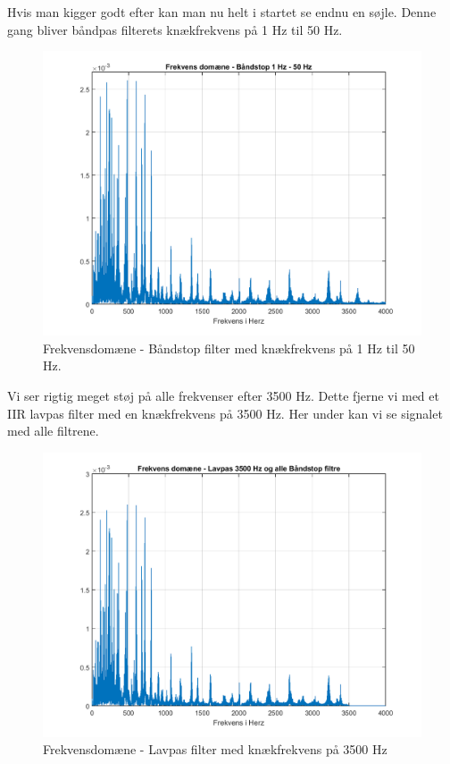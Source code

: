 \documentclass[12pt, letterpaper]{article}
\begin{document}
\newpage
Hvis man kigger godt efter kan man nu helt i startet se endnu en søjle. 
Denne gang bliver båndpas filterets knækfrekvens på 1 Hz til 50 Hz. 
\begin{figure}[H]
           \includegraphics[width=\linewidth]{billeder/VinylBS1}	   							\caption{Frekvensdomæne - Båndstop filter med knækfrekvens på 1 Hz til 50 Hz. }
\end{figure} 

\newpage
Vi ser rigtig meget støj på alle frekvenser efter 3500 Hz. Dette fjerne vi med et IIR lavpas filter med en knækfrekvens på 3500 Hz. Her under kan vi se signalet med alle filtrene. 
\begin{figure}[H]
           \includegraphics[width=\linewidth]{billeder/VinylLP3500}	   							\caption{Frekvensdomæne - Lavpas filter med knækfrekvens på 3500 Hz}
\end{figure} 
\end{document}
